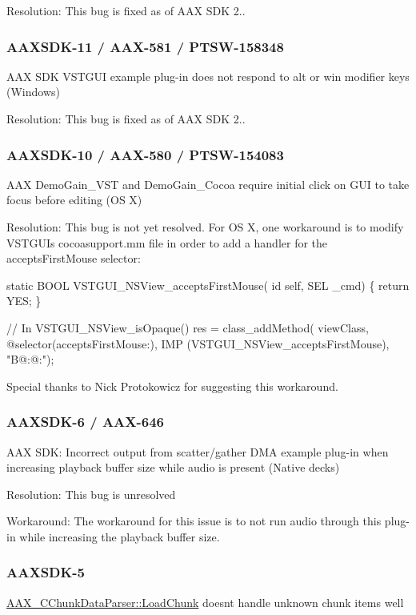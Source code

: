 Resolution\+: This bug is fixed as of A\+A\+X S\+D\+K 2..\hypertarget{a00374_AAXSDK-11}{}\subsubsection{A\+A\+X\+S\+D\+K-\/11 / A\+A\+X-\/581 / P\+T\+S\+W-\/158348}\label{a00374_AAXSDK-11}
A\+A\+X S\+D\+K V\+S\+T\+G\+U\+I example plug-\/in does not respond to \textquotesingle{}alt\textquotesingle{} or \textquotesingle{}win\textquotesingle{} modifier keys (Windows)

Resolution\+: This bug is fixed as of A\+A\+X S\+D\+K 2..\hypertarget{a00374_AAXSDK-10}{}\subsubsection{A\+A\+X\+S\+D\+K-\/10 / A\+A\+X-\/580 / P\+T\+S\+W-\/154083}\label{a00374_AAXSDK-10}
A\+A\+X Demo\+Gain\+\_\+\+V\+S\+T and Demo\+Gain\+\_\+\+Cocoa require initial click on G\+U\+I to take focus before editing (O\+S X)

Resolution\+: This bug is not yet resolved. For O\+S X, one workaround is to modify V\+S\+T\+G\+U\+I\textquotesingle{}s cocoasupport.\+mm file in order to add a handler for the accepts\+First\+Mouse selector\+:


\begin{DoxyCode}
\textcolor{keyword}{static} BOOL VSTGUI\_NSView\_acceptsFirstMouse(
  \textcolor{keywordtype}{id} \textcolor{keyword}{self},
  \textcolor{keywordtype}{SEL} \_cmd)
\{
  \textcolor{keywordflow}{return} YES;
\}

\textcolor{comment}{// In VSTGUI\_NSView\_isOpaque()}
res = class\_addMethod(
  viewClass,
  \textcolor{keyword}{@selector}(acceptsFirstMouse:),
  IMP (VSTGUI\_NSView\_acceptsFirstMouse),
  \textcolor{stringliteral}{"B@:@:"});
\end{DoxyCode}


Special thanks to Nick Protokowicz for suggesting this workaround.\hypertarget{a00374_AAXSDK-6}{}\subsubsection{A\+A\+X\+S\+D\+K-\/6 / A\+A\+X-\/646}\label{a00374_AAXSDK-6}
A\+A\+X S\+D\+K\+: Incorrect output from scatter/gather D\+M\+A example plug-\/in when increasing playback buffer size while audio is present (Native decks)

Resolution\+: This bug is unresolved

Workaround\+: The workaround for this issue is to not run audio through this plug-\/in while increasing the playback buffer size.\hypertarget{a00374_AAXSDK-5}{}\subsubsection{A\+A\+X\+S\+D\+K-\/5}\label{a00374_AAXSDK-5}
\hyperlink{a00014_a25fc41a1060445db4d7bee7a2919460d}{A\+A\+X\+\_\+\+C\+Chunk\+Data\+Parser\+::\+Load\+Chunk} doesn\textquotesingle{}t handle unknown chunk items well

